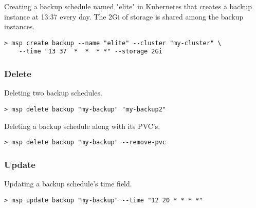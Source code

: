 \noindent Creating a backup schedule named "elite" in Kubernetes that creates
a backup instance at 13:37 every day. The 2Gi of storage is shared among
the backup instances.

\begin{lstlisting}
> msp create backup --name "elite" --cluster "my-cluster" \
	--time "13 37  *  *  * *" --storage 2Gi
\end{lstlisting}

\subsubsection*{Delete}
\noindent Deleting two backup schedules.

\begin{lstlisting}
> msp delete backup "my-backup" "my-backup2"
\end{lstlisting}

\noindent Deleting a backup schedule along with its PVC's.

\begin{lstlisting}
> msp delete backup "my-backup" --remove-pvc
\end{lstlisting}

\subsubsection*{Update}
\noindent Updating a backup schedule's time field.

\begin{lstlisting}
> msp update backup "my-backup" --time "12 20 * * * *"
\end{lstlisting}

